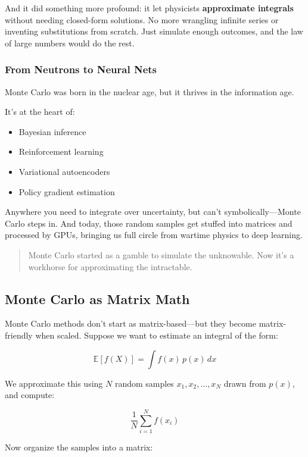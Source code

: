 And it did something more profound: it let physicists \textbf{approximate integrals} without needing closed-form solutions. No more wrangling infinite series or inventing substitutions from scratch. Just simulate enough outcomes, and the law of large numbers would do the rest.

\subsubsection{From Neutrons to Neural Nets}

Monte Carlo was born in the nuclear age, but it thrives in the information age.

It’s at the heart of:

\begin{itemize}
  \item Bayesian inference
  \item Reinforcement learning
  \item Variational autoencoders
  \item Policy gradient estimation
\end{itemize}

Anywhere you need to integrate over uncertainty, but can't symbolically—Monte Carlo steps in. And today, those random samples get stuffed into matrices and processed by GPUs, bringing us full circle from wartime physics to deep learning.

\begin{quote}
Monte Carlo started as a gamble to simulate the unknowable.  
Now it’s a workhorse for approximating the intractable.
\end{quote}



\subsection{Monte Carlo as Matrix Math}

Monte Carlo methods don’t start as matrix-based—but they become matrix-friendly when scaled. Suppose we want to estimate an integral of the form:

\[
\mathbb{E}[f(X)] = \int f(x) \, p(x) \, dx
\]

We approximate this using \( N \) random samples \( x_1, x_2, \ldots, x_N \) drawn from \( p(x) \), and compute:

\[
\frac{1}{N} \sum_{i=1}^N f(x_i)
\]

Now organize the samples into a matrix:


